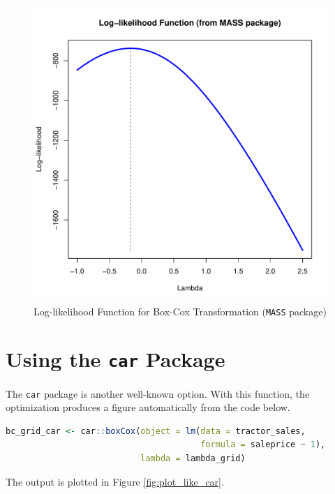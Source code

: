 \documentclass[11pt]{book}
\begin{document}
\begin{figure}[h!]
  \centering
  \includegraphics[scale = 0.5, keepaspectratio=true]{../Figures/plot_like_MASS}
  \caption{Log-likelihood Function for Box-Cox Transformation (\texttt{MASS} package)} \label{fig:plot_like_MASS}
\end{figure}


\clearpage
\section*{Using the \texttt{car} Package}

The \texttt{car} package is another well-known option.
With this function, the optimization produces 
a figure automatically from the code below.

\begin{lstlisting}[language=R]
bc_grid_car <- car::boxCox(object = lm(data = tractor_sales,
                                       formula = saleprice ~ 1),
                           lambda = lambda_grid)
\end{lstlisting}

The output is plotted in Figure \ref{fig:plot_like_car}.
\end{document}
